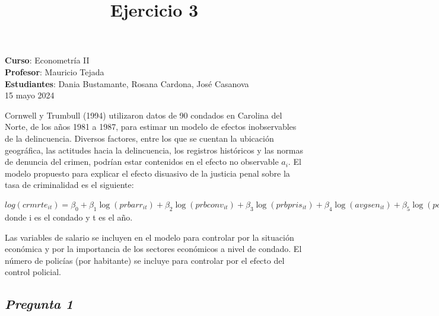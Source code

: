 \documentclass[
  12pt,
]{article}
\title{\textbf{Ejercicio 3}}
\author{}
\date{\vspace{-2.5em}}
\begin{document}
\maketitle

\maketitle
\vspace{-5em}
\vspace{0.5em}

\begin{center}
\footnotesize \textbf{Curso}: Econometría II \\
\footnotesize \textbf{Profesor}: Mauricio Tejada \\
\footnotesize \textbf{Estudiantes}: Dania Bustamante, Rosana Cardona, José Casanova \\
\footnotesize 15 mayo 2024 \\
\end{center}

Cornwell y Trumbull (1994) utilizaron datos de 90 condados en Carolina
del Norte, de los años 1981 a 1987, para estimar un modelo de efectos
inobservables de la delincuencia. Diversos factores, entre los que se
cuentan la ubicación geográfica, las actitudes hacia la delincuencia,
los registros históricos y las normas de denuncia del crimen, podrían
estar contenidos en el efecto no observable \(a_i\). El modelo propuesto
para explicar el efecto disuasivo de la justicia penal sobre la tasa de
criminalidad es el siguiente:

\hfill\break
\(log(crmrte_{it}) = \beta_0 + \beta_1\log(prbarr_{it}) + \beta_2\log(prbconv_{it}) + \beta_3\log(prbpris_{it})+ \beta_4\log(avgsen_{it}) + \beta_5\log(polpc_{it}) + \beta_6\log(wcon_{it}) + \beta_7\log(wtuc_{it}) + \beta_8\log(wtrd_{it}) + \beta_9\log(wfir_{it}) + \beta_{10}\log(wser_{it}) + \beta_{11}\log(wmfg_{it}) + \beta_{12}\log(wfed_{it}) + \beta_{13}\log(wsta_{it}) + \beta_{14}\log(wloc_{it}) + a_i + \epsilon_{it}\)\\

donde i es el condado y t es el año.

Las variables de salario se incluyen en el modelo para controlar por la
situación económica y por la importancia de los sectores económicos a
nivel de condado. El número de policías (por habitante) se incluye para
controlar por el efecto del control policial.

\subsection{\texorpdfstring{\textbf{\emph{Pregunta
1}}}{Pregunta 1}}\label{pregunta-1}
\end{document}
